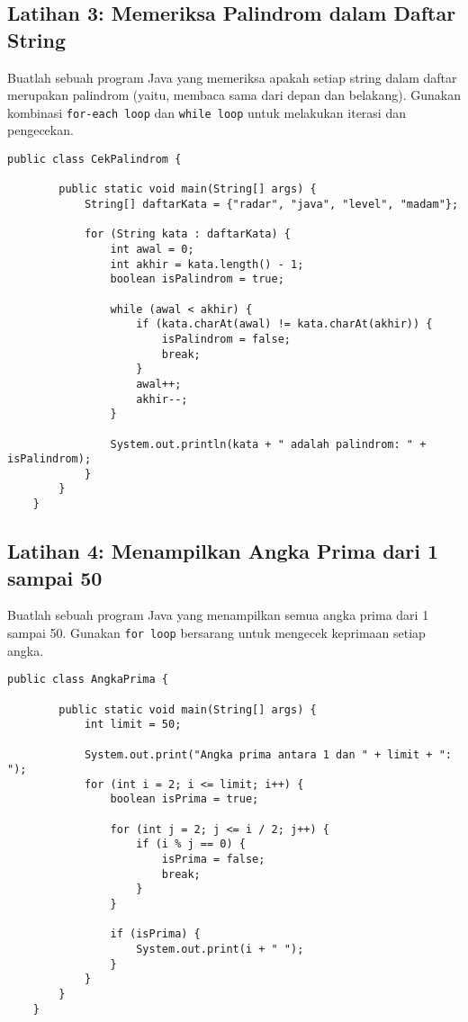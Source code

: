 \subsection{Latihan 3: Memeriksa Palindrom dalam Daftar String}

Buatlah sebuah program Java yang memeriksa apakah setiap string dalam daftar merupakan palindrom (yaitu, membaca sama dari depan dan belakang). Gunakan kombinasi \texttt{for-each loop} dan \texttt{while loop} untuk melakukan iterasi dan pengecekan.

\begin{lstlisting}[style=JavaStyle]
	public class CekPalindrom {
		
		public static void main(String[] args) {
			String[] daftarKata = {"radar", "java", "level", "madam"};
			
			for (String kata : daftarKata) {
				int awal = 0;
				int akhir = kata.length() - 1;
				boolean isPalindrom = true;
				
				while (awal < akhir) {
					if (kata.charAt(awal) != kata.charAt(akhir)) {
						isPalindrom = false;
						break;
					}
					awal++;
					akhir--;
				}
				
				System.out.println(kata + " adalah palindrom: " + isPalindrom);
			}
		}
	}
\end{lstlisting}

\subsection{Latihan 4: Menampilkan Angka Prima dari 1 sampai 50}

Buatlah sebuah program Java yang menampilkan semua angka prima dari 1 sampai 50. Gunakan \texttt{for loop} bersarang untuk mengecek keprimaan setiap angka.

\begin{lstlisting}[style=JavaStyle]
	public class AngkaPrima {
		
		public static void main(String[] args) {
			int limit = 50;
			
			System.out.print("Angka prima antara 1 dan " + limit + ": ");
			for (int i = 2; i <= limit; i++) {
				boolean isPrima = true;
				
				for (int j = 2; j <= i / 2; j++) {
					if (i % j == 0) {
						isPrima = false;
						break;
					}
				}
				
				if (isPrima) {
					System.out.print(i + " ");
				}
			}
		}
	}
\end{lstlisting}


